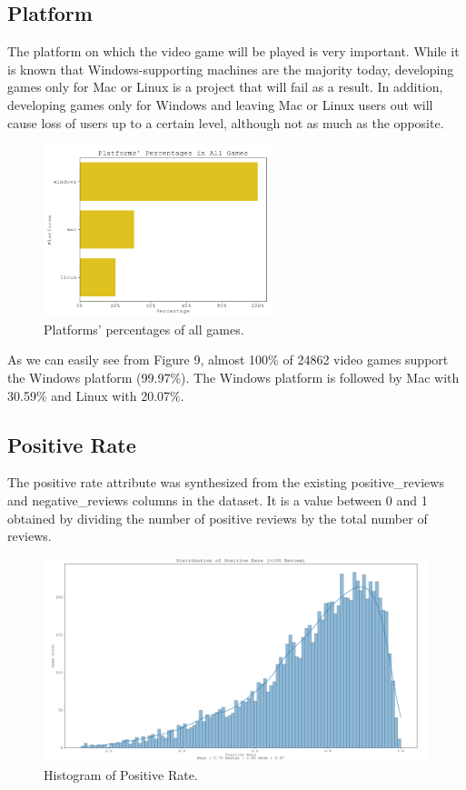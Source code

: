 \documentclass[conference]{IEEEtran}
\begin{document}
\subsection{Platform}
The platform on which the video game will be played is very important. While it is known that Windows-supporting machines are the majority today, developing games only for Mac or Linux is a project that will fail as a result. In addition, developing games only for Windows and leaving Mac or Linux users out will cause loss of users up to a certain level, although not as much as the opposite.

\begin{figure}[h]
  \includegraphics[width=\linewidth, height=5cm]{assets-1/platforms_dist.png}
  \caption{Platforms' percentages of all games.}
  \label{fig:platform1}
\end{figure}

As we can easily see from Figure 9, almost 100\% of 24862 video games support the Windows platform (99.97\%). The Windows platform is followed by Mac with 30.59\% and Linux with 20.07\%.

\subsection{Positive Rate}
The positive rate attribute was synthesized from the existing positive\_reviews and negative\_reviews columns in the dataset. It is a value between 0 and 1 obtained by dividing the number of positive reviews by the total number of reviews.

\begin{figure}[h]
  \includegraphics[width=\linewidth]{assets-1/positive_rate_dist.png}
  \caption{Histogram of Positive Rate.}
  \label{fig:positiverate1}
\end{figure}
\end{document}
